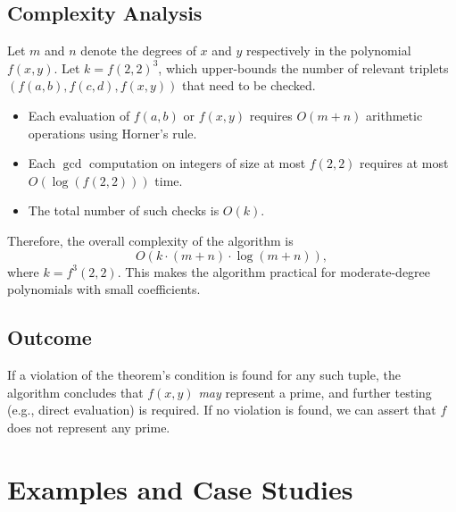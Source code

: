 \documentclass[a4paper,11pt]{article}
\begin{document}
	\subsection*{Complexity Analysis}
	
	Let $m$ and $n$ denote the degrees of $x$ and $y$ respectively in the polynomial $f(x, y)$. Let $k = f(2,2)^3$, which upper-bounds the number of relevant triplets $(f(a,b), f(c,d), f(x,y))$ that need to be checked.
	
	\begin{itemize}
		\item Each evaluation of $f(a,b)$ or $f(x,y)$ requires $O(m + n)$ arithmetic operations using Horner’s rule.
		\item Each $\gcd$ computation on integers of size at most $f(2,2)$ requires at most $O(\log(f(2,2)))$ time.
		\item The total number of such checks is $O(k)$.
	\end{itemize}
	
	Therefore, the overall complexity of the algorithm is
	\[
	O\left(k \cdot (m+n) \cdot \log(m+n)\right),
	\]
	where $k = f^3(2,2)$. This makes the algorithm practical for moderate-degree polynomials with small coefficients.
	
	\subsection*{Outcome}
	
	If a violation of the theorem's condition is found for any such tuple, the algorithm concludes that $f(x, y)$ \emph{may} represent a prime, and further testing (e.g., direct evaluation) is required. If no violation is found, we can assert that $f$ does not represent any prime.
	
	
	
	\section{Examples and Case Studies}
	
\end{document}
